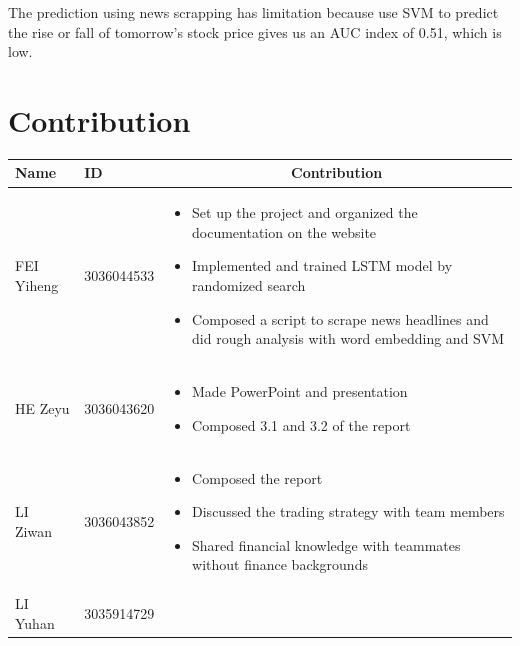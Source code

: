 \documentclass[a4paper, 11pt]{my-elegantpaper}
\begin{document}
The prediction using news scrapping has limitation because use SVM to predict the rise or fall of tomorrow's stock price gives us an AUC index of 0.51, which is low.


\printbibliography


\appendix
\appendixpage
\addappheadtotoc

\section{Contribution}

\begin{table}[H]
    \centering
    \begin{tabular}{l l p{10cm}}
        \toprule
        Name & ID & \multicolumn{1}{c}{Contribution}\\
        \midrule
        FEI Yiheng
        & 3036044533
        & \begin{itemize}
            \item Set up the project and organized the documentation on the website
            \item Implemented and trained LSTM model by randomized search
            \item Composed a script to scrape news headlines and did rough analysis with word embedding and SVM
        \end{itemize}\\
        HE Zeyu 
        & 3036043620
        & \begin{itemize}
            \item Made PowerPoint and presentation
            \item Composed 3.1 and 3.2 of the report
        \end{itemize} \\ 
        LI Ziwan
        & 3036043852
        & \begin{itemize}
            \item Composed the report
            \item Discussed the trading strategy with team members 
            \item Shared financial knowledge with teammates without finance backgrounds
        \end{itemize}\\
        LI Yuhan
        & 3035914729
        & \begin{itemize}

\end{itemize}
\end{tabular}
\end{table}
\end{document}
